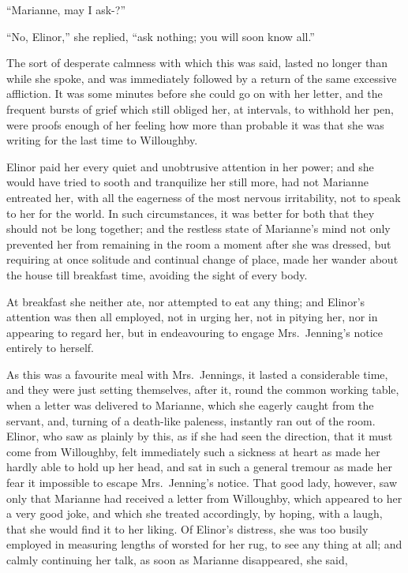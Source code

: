 ``Marianne, may I ask-?''

``No, Elinor,'' she replied, ``ask nothing; you will
soon know all.''

The sort of desperate calmness with which this was said,
lasted no longer than while she spoke, and was immediately
followed by a return of the same excessive affliction.
It was some minutes before she could go on with her letter,
and the frequent bursts of grief which still obliged her,
at intervals, to withhold her pen, were proofs enough of her
feeling how more than probable it was that she was writing
for the last time to Willoughby.

Elinor paid her every quiet and unobtrusive attention
in her power; and she would have tried to sooth and
tranquilize her still more, had not Marianne entreated her,
with all the eagerness of the most nervous irritability,
not to speak to her for the world.  In such circumstances,
it was better for both that they should not be long together;
and the restless state of Marianne's mind not only prevented
her from remaining in the room a moment after she was dressed,
but requiring at once solitude and continual change of place,
made her wander about the house till breakfast time, avoiding
the sight of every body.

At breakfast she neither ate, nor attempted to eat
any thing; and Elinor's attention was then all employed,
not in urging her, not in pitying her, nor in appearing
to regard her, but in endeavouring to engage Mrs.\ Jenning's
notice entirely to herself.

As this was a favourite meal with Mrs.\ Jennings,
it lasted a considerable time, and they were just setting
themselves, after it, round the common working table, when a
letter was delivered to Marianne, which she eagerly caught
from the servant, and, turning of a death-like paleness,
instantly ran out of the room.  Elinor, who saw as plainly
by this, as if she had seen the direction, that it must
come from Willoughby, felt immediately such a sickness
at heart as made her hardly able to hold up her head,
and sat in such a general tremour as made her fear it
impossible to escape Mrs.\ Jenning's notice.  That good lady,
however, saw only that Marianne had received a letter
from Willoughby, which appeared to her a very good joke,
and which she treated accordingly, by hoping, with a laugh,
that she would find it to her liking.  Of Elinor's distress,
she was too busily employed in measuring lengths of worsted
for her rug, to see any thing at all; and calmly continuing
her talk, as soon as Marianne disappeared, she said,

